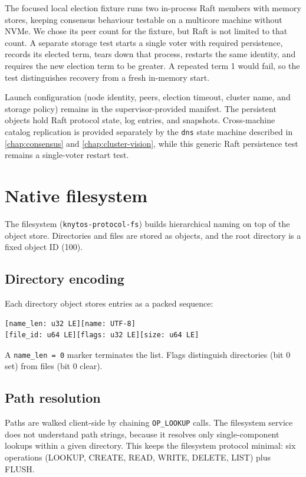 The focused local election fixture runs two in-process Raft members with memory
stores, keeping consensus behaviour testable on a multicore machine without
NVMe. We chose its peer count for the fixture, but Raft is not limited to that count.
A separate storage test starts a single voter with required persistence,
records its elected term, tears down that process, restarts the same identity,
and requires the new election term to be greater. A repeated term 1 would
fail, so the test distinguishes recovery from a fresh in-memory start.

Launch configuration (node identity, peers, election timeout, cluster name,
and storage policy) remains in the supervisor-provided manifest. The
persistent objects hold Raft protocol state, log entries, and snapshots.
Cross-machine catalog replication is provided separately by the \texttt{dns}
state machine described in \autoref{chap:consensus} and
\autoref{chap:cluster-vision}, while this generic Raft persistence test
remains a single-voter restart test.

\section{Native filesystem}

The filesystem (\texttt{knytos-protocol-fs}) builds hierarchical naming on
top of the object store. Directories and files are stored as objects, and the root
directory is a fixed object ID (100).

\subsection{Directory encoding}

Each directory object stores entries as a packed sequence:

\begin{verbatim}
[name_len: u32 LE][name: UTF-8]
[file_id: u64 LE][flags: u32 LE][size: u64 LE]
\end{verbatim}

A \texttt{name\_len = 0} marker terminates the list. Flags distinguish
directories (bit 0 set) from files (bit 0 clear).

\subsection{Path resolution}

Paths are walked client-side by chaining \texttt{OP\_LOOKUP} calls. The
filesystem service does not understand path strings, because it resolves only
single-component lookups within a given directory. This keeps the filesystem
protocol minimal: six operations (LOOKUP, CREATE, READ, WRITE, DELETE, LIST)
plus FLUSH.

